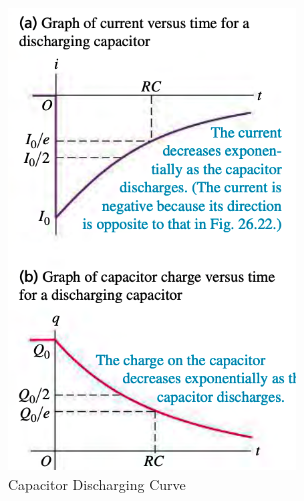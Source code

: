 \documentclass[12pt]{amsart}
\theoremstyle{definition}
\numberwithin{equation}{theorem}    %
\begin{document}
\begin{figure}[h]
    \centering
    \includegraphics[width=3in,scale=0.25]{Media/Discharging.png}
    \caption{Capacitor Discharging Curve}
    \label{Capacitor Discharging Curve}
\end{figure}
\end{document}
